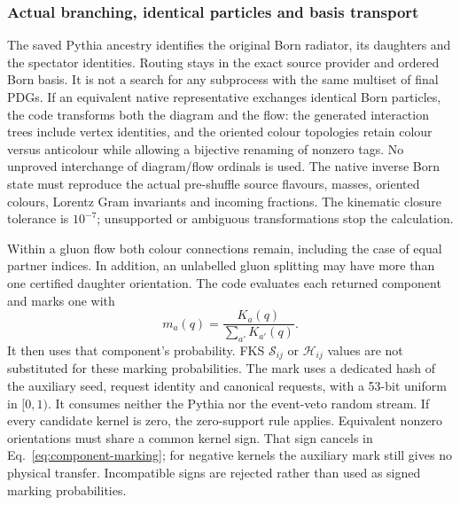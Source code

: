 \subsubsection{Actual branching, identical particles and basis transport}

The saved Pythia ancestry identifies the original Born radiator, its
daughters and the spectator identities. Routing stays in the exact
source provider and ordered Born basis. It is not a search for any
subprocess with the same multiset of final PDGs. If an equivalent native
representative exchanges identical Born particles, the code transforms
both the diagram and the flow: the generated interaction trees include
vertex identities, and the oriented colour topologies retain colour
versus anticolour while allowing a bijective renaming of nonzero tags.
No unproved interchange of diagram/flow ordinals is used.
The native inverse Born state must reproduce the actual pre-shuffle
source flavours, masses, oriented colours, Lorentz Gram invariants and
incoming fractions. The kinematic closure tolerance is $10^{-7}$;
unsupported or ambiguous transformations stop the calculation.

Within a gluon flow both colour connections remain, including the case
of equal partner indices. In addition, an unlabelled gluon splitting
may have more than one certified daughter orientation. The code evaluates
each returned component and marks one with
\begin{equation}
 m_a(q)=\frac{K_a(q)}{\sum_{a'}K_{a'}(q)}.
 \label{eq:component-marking}
\end{equation}
It then uses that component's probability. FKS $\mathcal S_{ij}$ or
$\mathcal H_{ij}$ values are not substituted for these marking
probabilities. The mark uses a dedicated hash of the auxiliary seed,
request identity and canonical requests, with a 53-bit uniform in
$[0,1)$. It consumes neither the Pythia nor the event-veto random stream.
If every candidate kernel is zero, the zero-support rule applies.
Equivalent nonzero orientations must share a common kernel sign. That
sign cancels in Eq.~\eqref{eq:component-marking}; for negative kernels
the auxiliary mark still gives no physical transfer. Incompatible signs
are rejected rather than used as signed marking probabilities.

